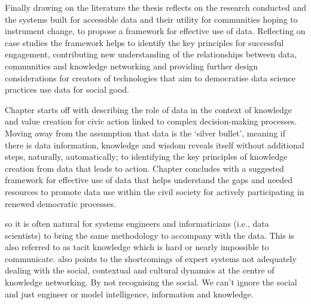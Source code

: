 Finally drawing on the literature the thesis reflects on the research conducted and the systems built for accessible data and their utility for communities hoping to instrument change, to propose a framework for effective use of data. Reflecting on case studies the framework helps to identify the key principles for successful engagement, contributing new understanding of the relationships between data, communities and knowledge networking and providing further design considerations for creators of technologies that aim to democratise data science practices use data for social good.

Chapter starts off with describing the role of data in the context of knowledge and value creation for civic action linked to complex decision-making processes. Moving away from the assumption that data is the `silver bullet', meaning if there is data information, knowledge and wisdom reveals itself without additional steps, naturally, automatically; to identifying the key principles of knowledge creation from data that leads to action. Chapter concludes with a suggested framework for effective use of data that helps understand the gaps and needed resources to promote data use within the civil society for actively participating in renewed democratic processes. 


so it is often natural for systems engineers and informaticians (i.e., data scientists) to bring the same methodology to accompany with the data.
This is also referred to as tacit knowledge which is hard or nearly impossible to communicate.
\cite{hakken_social_2003} also points to the shortcomings of expert systems not adequately dealing with the social, contextual and cultural dynamics at the centre of knowledge networking. By not recognising the social. We can’t ignore the social and just engineer or model intelligence, information and knowledge.

